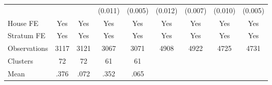 {\begin{tabular}{l*{8}{c}}
                &                  &                  &  (0.011)         &  (0.005)         &  (0.012)         &  (0.007)         &  (0.010)         &  (0.005)         \\
House FE        &      Yes         &      Yes         &      Yes         &      Yes         &      Yes         &      Yes         &      Yes         &      Yes         \\
Stratum FE      &      Yes         &      Yes         &      Yes         &      Yes         &      Yes         &      Yes         &      Yes         &      Yes         \\
\midrule
Observations    &     3117         &     3121         &     3067         &     3071         &     4908         &     4922         &     4725         &     4731         \\
Clusters        &       72         &       72         &       61         &       61         &                  &                  &                  &                  \\
Mean            &     .376         &     .072         &     .352         &     .065         &                  &                  &                  &                  \\
\bottomrule
\end{tabular}
}
